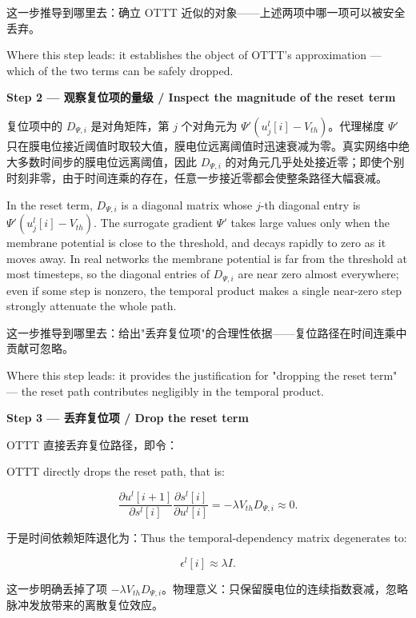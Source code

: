 \documentclass[journal,12pt,onecolumn]{IEEEtran}
\begin{document}
这一步推导到哪里去：确立 OTTT 近似的对象——上述两项中哪一项可以被安全丢弃。

Where this step leads: it establishes the object of OTTT's approximation — which of the two terms can be safely dropped.

\medskip\noindent\textbf{Step 2 — 观察复位项的量级 / Inspect the magnitude of the reset term}

复位项中的 $D_{\Psi,i}$ 是对角矩阵，第 $j$ 个对角元为 $\Psi'(u_j^l[i]-V_{th})$。代理梯度 $\Psi'$ 只在膜电位接近阈值时取较大值，膜电位远离阈值时迅速衰减为零。真实网络中绝大多数时间步的膜电位远离阈值，因此 $D_{\Psi,i}$ 的对角元几乎处处接近零；即使个别时刻非零，由于时间连乘的存在，任意一步接近零都会使整条路径大幅衰减。

In the reset term, $D_{\Psi,i}$ is a diagonal matrix whose $j$-th diagonal entry is $\Psi'(u_j^l[i]-V_{th})$. The surrogate gradient $\Psi'$ takes large values only when the membrane potential is close to the threshold, and decays rapidly to zero as it moves away. In real networks the membrane potential is far from the threshold at most timesteps, so the diagonal entries of $D_{\Psi,i}$ are near zero almost everywhere; even if some step is nonzero, the temporal product makes a single near-zero step strongly attenuate the whole path.

这一步推导到哪里去：给出"丢弃复位项"的合理性依据——复位路径在时间连乘中贡献可忽略。

Where this step leads: it provides the justification for "dropping the reset term" — the reset path contributes negligibly in the temporal product.

\medskip\noindent\textbf{Step 3 — 丢弃复位项 / Drop the reset term}

OTTT 直接丢弃复位路径，即令：

OTTT directly drops the reset path, that is:

\begin{equation}
\frac{\partial u^{l}[i+1]}{\partial s^{l}[i]} \frac{\partial s^{l}[i]}{\partial u^{l}[i]} = -\lambda V_{th} D_{\Psi,i} \approx 0.
\end{equation}

于是时间依赖矩阵退化为：Thus the temporal-dependency matrix degenerates to:

\begin{equation}
\epsilon^l[i] \approx \lambda I.
\end{equation}

这一步明确丢掉了项 $-\lambda V_{th} D_{\Psi,i}$。物理意义：只保留膜电位的连续指数衰减，忽略脉冲发放带来的离散复位效应。
\end{document}
